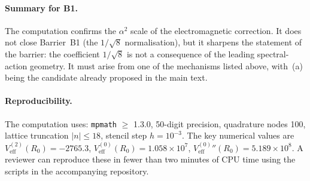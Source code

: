 \paragraph{Summary for B1.}
The computation confirms the $\alpha^2$ scale of the electromagnetic
correction.  It does not close Barrier~B1 (the $1/\sqrt{8}$
normalisation), but it sharpens the statement of the barrier: the
coefficient $1/\sqrt{8}$ is not a consequence of the leading
spectral-action geometry.  It must arise from one of the mechanisms
listed above, with~(a) being the candidate already proposed in the
main text.

\paragraph{Reproducibility.}
The computation uses: \texttt{mpmath} $\geq$ 1.3.0, 50-digit
precision, quadrature nodes 100, lattice truncation $|n|\leq 18$,
stencil step $h=10^{-3}$.  The key numerical values are
$V_{\mathrm{eff}}^{(2)}(R_0) = -2765.3$,
$V_{\mathrm{eff}}^{(0)}(R_0) = 1.058\times10^7$,
$V_{\mathrm{eff}}^{(0)}''\!(R_0) = 5.189\times10^8$.
A reviewer can reproduce these in fewer than two minutes of CPU time
using the scripts in the accompanying repository.

